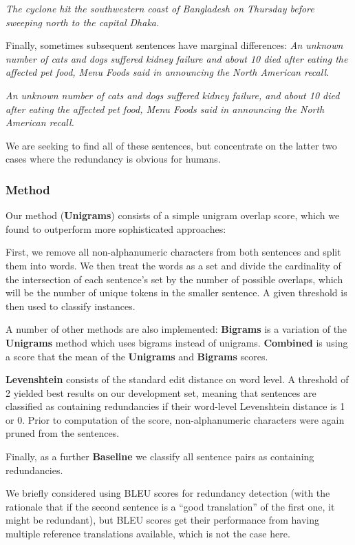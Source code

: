 \documentclass[a4paper,10pt]{scrartcl}
\theoremstyle{style}
\begin{document}
\textit{The cyclone hit the southwestern coast of Bangladesh on Thursday before sweeping north to the capital Dhaka.}

Finally, sometimes subsequent sentences have marginal differences:
\textit{An unknown number of cats and dogs suffered kidney failure and about 10 died after eating the affected pet food, Menu Foods said in announcing the North American recall.}

\textit{An unknown number of cats and dogs suffered kidney failure, and about 10 died after eating the affected pet food, Menu Foods said in announcing the North American recall.}

We are seeking to find all of these sentences, but concentrate on the latter two cases where the redundancy is obvious for humans.

\subsubsection{Method}
\label{s_unigrams}

Our method (\textbf{Unigrams}) consists of a simple unigram overlap score, which we found to outperform more sophisticated approaches:

First, we remove all non-alphanumeric characters from both sentences and split them into words. We then treat the words as a set and divide the cardinality of the intersection of each sentence's set by the number of possible overlaps, which will be the number of unique tokens in the smaller sentence. A given threshold is then used to classify instances.

A number of other methods are also implemented: \textbf{Bigrams} is a variation of the \textbf{Unigrams} method which uses bigrams instead of unigrams. \textbf{Combined} is using a score that the mean of the \textbf{Unigrams} and \textbf{Bigrams} scores.

\textbf{Levenshtein} consists of the standard edit distance \citep{levenshtein1966binary} on word level. A threshold of 2 yielded best results on our development set, meaning that sentences are classified as containing redundancies if their word-level Levenshtein distance is 1 or 0. Prior to computation of the score, non-alphanumeric characters were again pruned from the sentences.

Finally, as a further \textbf{Baseline} we classify all sentence pairs as containing redundancies.

We briefly considered using BLEU scores \citep{papineni2002bleu} for redundancy detection (with the rationale that if the second sentence is a ``good translation'' of the first one, it might be redundant), but BLEU scores get their performance from having multiple reference translations available, which is not the case here.
\end{document}
